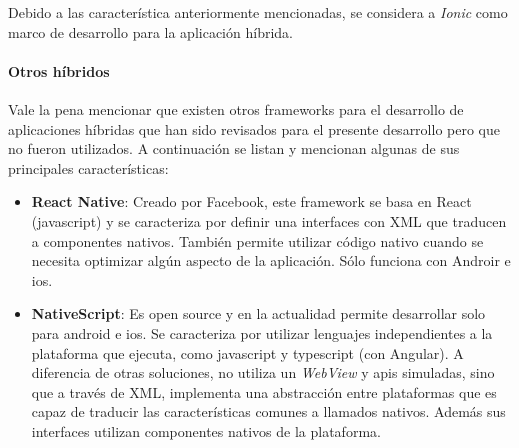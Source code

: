 Debido a las característica anteriormente mencionadas, se considera a \textit{Ionic} como marco de desarrollo para la aplicación híbrida.

\paragraph{Otros  híbridos}
\label{otros_frameworks_hibridos}

Vale la pena mencionar que existen otros \glspl{framework} para el desarrollo de aplicaciones híbridas que han sido revisados para el presente desarrollo pero que no fueron utilizados. A continuación se listan y mencionan algunas de sus principales características:
\begin{itemize}
\item \textbf{React Native}: Creado por Facebook, este \gls{framework} se basa en React (\gls{javascript}) y se caracteriza por definir una interfaces con \gls{XML} que traducen a componentes nativos. También permite utilizar código nativo cuando se necesita optimizar algún aspecto de la aplicación. Sólo funciona con Androir e \gls{ios}.
\item \textbf{NativeScript}: Es \gls{open source} y en la actualidad permite desarrollar solo para \gls{android} e \gls{ios}. Se caracteriza por utilizar lenguajes independientes a la plataforma que ejecuta, como \gls{javascript} y \gls{typescript} (con Angular). A diferencia de otras soluciones, no utiliza un \textit{WebView} y \glspl{api} simuladas, sino que a través de \gls{XML}, implementa una abstracción entre plataformas que es capaz de traducir las características comunes a llamados nativos\cite{nativescript2017basics}. Además sus interfaces utilizan componentes nativos de la plataforma.
\end{itemize}
